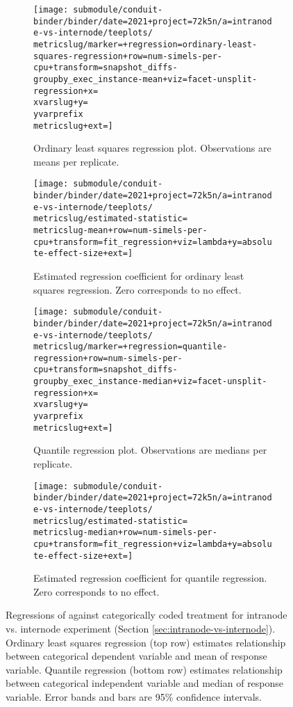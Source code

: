 \begin{figure*}
  \centering

  \begin{subfigure}[b]{0.5\textwidth}
    \centering
    \texttt{[image: submodule/conduit-binder/binder/date=2021+project=72k5n/a=intranode-vs-internode/teeplots/\\metricslug/marker=+regression=ordinary-least-squares-regression+row=num-simels-per-cpu+transform=snapshot\_diffs-groupby\_exec\_instance-mean+viz=facet-unsplit-regression+x=\\xvarslug+y=\\yvarprefix\\metricslug+ext=]}
    \caption{
      Ordinary least squares regression plot.
      Observations are means per replicate.
    }
    \label{fig:intranode-vs-internode-regression-ols-\metricslug-complete-regression}
  \end{subfigure}%
  \begin{subfigure}[b]{0.5\textwidth}
    \centering
    \texttt{[image: submodule/conduit-binder/binder/date=2021+project=72k5n/a=intranode-vs-internode/teeplots/\\metricslug/estimated-statistic=\\metricslug-mean+row=num-simels-per-cpu+transform=fit\_regression+viz=lambda+y=absolute-effect-size+ext=]}
    \caption{Estimated regression coefficient for ordinary least squares regression. Zero corresponds to no effect.}
    \label{fig:intranode-vs-internode-regression-ols-\metricslug-complete-effect-size}
  \end{subfigure}

  \begin{subfigure}[b]{0.5\textwidth}
    \centering
    \texttt{[image: submodule/conduit-binder/binder/date=2021+project=72k5n/a=intranode-vs-internode/teeplots/\\metricslug/marker=+regression=quantile-regression+row=num-simels-per-cpu+transform=snapshot\_diffs-groupby\_exec\_instance-median+viz=facet-unsplit-regression+x=\\xvarslug+y=\\yvarprefix\\metricslug+ext=]}
    \caption{
      Quantile regression plot.
      Observations are medians per replicate.
    }
    \label{fig:intranode-vs-internode-regression-quantile-\metricslug-complete-regression}
  \end{subfigure}%
  \begin{subfigure}[b]{0.5\textwidth}
    \centering
    \texttt{[image: submodule/conduit-binder/binder/date=2021+project=72k5n/a=intranode-vs-internode/teeplots/\\metricslug/estimated-statistic=\\metricslug-median+row=num-simels-per-cpu+transform=fit\_regression+viz=lambda+y=absolute-effect-size+ext=]}
    \caption{Estimated regression coefficient for quantile regression. Zero corresponds to no effect.}
    \label{fig:intranode-vs-internode-regression-quantile-\metricslug-complete-effect-size}
  \end{subfigure}

  \caption{
  Regressions of \metric{} against categorically coded treatment for intranode vs. internode experiment (Section \ref{sec:intranode-vs-internode}).
  Ordinary least squares regression (top row) estimates relationship between categorical dependent variable and mean of response variable.
  Quantile regression (bottom row) estimates relationship between categorical independent variable and median of response variable.
  Error bands and bars are 95\% confidence intervals.
  }
  \label{fig:intranode-vs-internode-regression-\metricslug}
\end{figure*}
